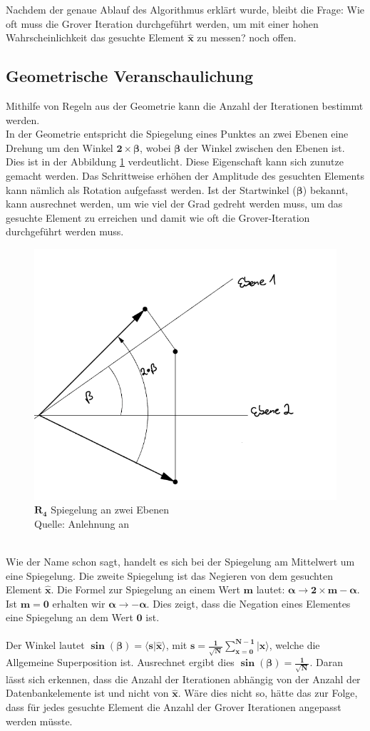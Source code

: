 Nachdem der genaue Ablauf des Algorithmus erklärt wurde, bleibt die Frage: Wie oft muss die Grover Iteration durchgeführt werden, um mit einer hohen Wahrscheinlichkeit das gesuchte Element $\mathbf{\hat{x}}$ zu messen? noch offen.

\subsection{Geometrische Veranschaulichung}
Mithilfe von Regeln aus der Geometrie kann die Anzahl der Iterationen bestimmt werden.
\\
In der Geometrie entspricht die Spiegelung eines Punktes an zwei Ebenen eine Drehung um den Winkel $\mathbf{2 \times \beta}$, wobei $\mathbf{\beta}$ der Winkel zwischen den Ebenen ist. Dies ist in der Abbildung \ref{fig:zweiEbenen} verdeutlicht. Diese Eigenschaft kann sich zunutze gemacht werden. Das Schrittweise erhöhen der Amplitude des gesuchten Elements kann nämlich als Rotation aufgefasst werden. Ist der Startwinkel ($\mathbf{\beta}$) bekannt, kann ausrechnet werden, um wie viel der Grad gedreht werden muss, um das gesuchte Element zu erreichen und damit wie oft die Grover-Iteration durchgeführt werden muss.
\begin{figure}[hbtp]
	\centering
	\includegraphics[width=.6\textwidth]{figures/zweiEbenen.png}
	\caption{$\mathbf{R_4}$ Spiegelung an zwei Ebenen \\ Quelle: Anlehnung an \cite[S. 149]{Homeister.2018}}
	\label{fig:zweiEbenen}
\end{figure} 
\noindent
\\
Wie der Name schon sagt, handelt es sich bei der Spiegelung am Mittelwert um eine Spiegelung. Die zweite Spiegelung ist das Negieren von dem gesuchten Element $\mathbf{\hat{x}}$. Die Formel zur Spiegelung an einem Wert $\mathbf{m}$ lautet: $\mathbf{\alpha \rightarrow 2 \times m - \alpha}$. Ist $\mathbf{m=0}$ erhalten wir $\mathbf{\alpha \rightarrow - \alpha}$. Dies zeigt, dass die Negation eines Elementes eine Spiegelung an dem Wert $\mathbf{0}$ ist.
\\ 
\\
Der Winkel lautet $\mathbf{\sin(\beta) = \langle s | \hat{x} \rangle}$, mit $\mathbf{s = \frac{1}{\sqrt{N}}\sum\limits_{x=0}^{N-1}|x\rangle}$, welche die Allgemeine Superposition ist. Ausrechnet ergibt dies $\mathbf{\sin(\beta) = \frac{1}{\sqrt N}}$. Daran lässt sich erkennen, dass die Anzahl der Iterationen abhängig von der Anzahl der Datenbankelemente ist und nicht von $\mathbf{\hat{x}}$. Wäre dies nicht so, hätte das zur Folge, dass für jedes gesuchte Element die Anzahl der Grover Iterationen angepasst werden müsste.
